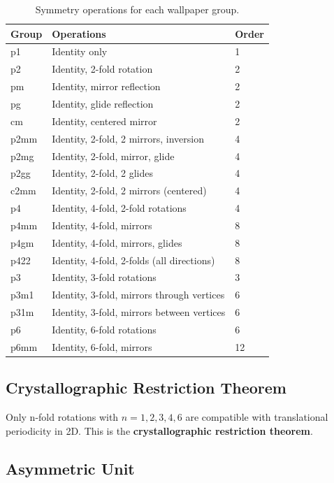 \begin{table}[h]
\centering
\small
\begin{tabular}{lll}
\hline\hline
\textbf{Group} & \textbf{Operations} & \textbf{Order} \\
\hline
p1 & Identity only & 1 \\
p2 & Identity, 2-fold rotation & 2 \\
pm & Identity, mirror reflection & 2 \\
pg & Identity, glide reflection & 2 \\
cm & Identity, centered mirror & 2 \\
p2mm & Identity, 2-fold, 2 mirrors, inversion & 4 \\
p2mg & Identity, 2-fold, mirror, glide & 4 \\
p2gg & Identity, 2-fold, 2 glides & 4 \\
c2mm & Identity, 2-fold, 2 mirrors (centered) & 4 \\
p4 & Identity, 4-fold, 2-fold rotations & 4 \\
p4mm & Identity, 4-fold, mirrors & 8 \\
p4gm & Identity, 4-fold, mirrors, glides & 8 \\
p422 & Identity, 4-fold, 2-folds (all directions) & 8 \\
p3 & Identity, 3-fold rotations & 3 \\
p3m1 & Identity, 3-fold, mirrors through vertices & 6 \\
p31m & Identity, 3-fold, mirrors between vertices & 6 \\
p6 & Identity, 6-fold rotations & 6 \\
p6mm & Identity, 6-fold, mirrors & 12 \\
\hline\hline
\end{tabular}
\caption{Symmetry operations for each wallpaper group.}
\end{table}

\subsection{Crystallographic Restriction Theorem}

Only n-fold rotations with $n = 1, 2, 3, 4, 6$ are compatible with translational periodicity in 2D. This is the \textbf{crystallographic restriction theorem}.

\subsection{Asymmetric Unit}


